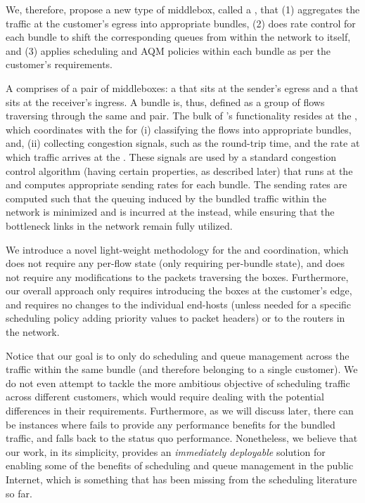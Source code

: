 We, therefore, propose a new type of middlebox, called a \name, that (1) aggregates the traffic at the customer's egress into appropriate bundles, (2) does rate control for each bundle to shift the corresponding queues from within the network to itself, and (3) applies scheduling and AQM policies within each bundle as per the customer's requirements. 

 A \name comprises of a pair of middleboxes: a \inbox that sits at the sender's egress and a \outbox that sits at the receiver's ingress. A bundle is, thus, defined as a group of flows traversing through the same \inbox and \outbox pair. The bulk of \name's functionality resides at the \inbox, which coordinates with the \outbox for (i) classifying the flows into appropriate bundles, and,  (ii) collecting congestion signals, such as the round-trip time, and the rate at which traffic arrives at the \outbox. These signals are used by a standard congestion control algorithm (having certain properties, as described later) that runs at the \inbox and computes appropriate sending rates for each bundle. The sending rates are computed such that the queuing induced by the bundled traffic within the network is minimized and is incurred at the \inbox instead, while ensuring that the bottleneck links in the network remain fully utilized. 
 
 We introduce a novel light-weight methodology for the \inbox and \outbox coordination, which does not require any per-flow state (only requiring per-bundle state), and does not require any modifications to the packets traversing the \name boxes. Furthermore, our overall approach only requires introducing the \name boxes at the customer's edge, and requires no changes to the individual end-hosts (unless needed for a specific scheduling policy \eg adding priority values to packet headers) or to the routers in the network. 
 
 Notice that our goal is to only do scheduling and queue management across the traffic within the same bundle (and therefore belonging to a single customer). We do not even attempt to tackle the more ambitious objective of  scheduling traffic across different customers, which would require dealing with the potential differences in their requirements. Furthermore, as we will discuss later, there can be instances where \name fails to provide any performance benefits for the bundled traffic, and falls back to the status quo performance. Nonetheless, we believe that our work, in its simplicity, provides an \emph{immediately deployable} solution for enabling some of the benefits of scheduling and queue management in the public Internet, which is something that has been missing from the scheduling literature so far. 

